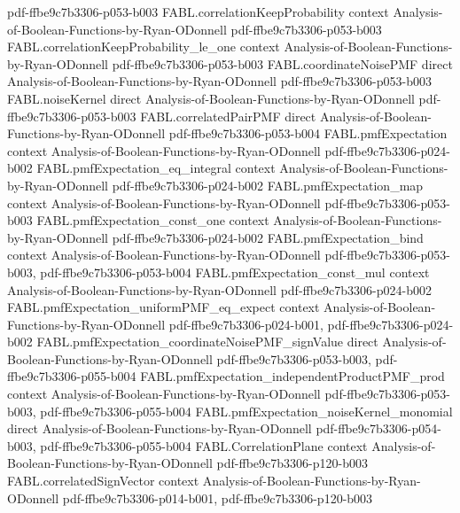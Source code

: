 \begin{theorem}
  {pdf-ffbe9c7b3306-p053-b003}
\proofstep
  {FABL.correlationKeepProbability}
  {context}
  {Analysis-of-Boolean-Functions-by-Ryan-ODonnell}
  {pdf-ffbe9c7b3306-p053-b003}
\proofstep
  {FABL.correlationKeepProbability_le_one}
  {context}
  {Analysis-of-Boolean-Functions-by-Ryan-ODonnell}
  {pdf-ffbe9c7b3306-p053-b003}
\proofstep
  {FABL.coordinateNoisePMF}
  {direct}
  {Analysis-of-Boolean-Functions-by-Ryan-ODonnell}
  {pdf-ffbe9c7b3306-p053-b003}
\proofstep
  {FABL.noiseKernel}
  {direct}
  {Analysis-of-Boolean-Functions-by-Ryan-ODonnell}
  {pdf-ffbe9c7b3306-p053-b003}
\proofstep
  {FABL.correlatedPairPMF}
  {direct}
  {Analysis-of-Boolean-Functions-by-Ryan-ODonnell}
  {pdf-ffbe9c7b3306-p053-b004}
\proofstep
  {FABL.pmfExpectation}
  {context}
  {Analysis-of-Boolean-Functions-by-Ryan-ODonnell}
  {pdf-ffbe9c7b3306-p024-b002}
\proofstep
  {FABL.pmfExpectation_eq_integral}
  {context}
  {Analysis-of-Boolean-Functions-by-Ryan-ODonnell}
  {pdf-ffbe9c7b3306-p024-b002}
\proofstep
  {FABL.pmfExpectation_map}
  {context}
  {Analysis-of-Boolean-Functions-by-Ryan-ODonnell}
  {pdf-ffbe9c7b3306-p053-b003}
\proofstep
  {FABL.pmfExpectation_const_one}
  {context}
  {Analysis-of-Boolean-Functions-by-Ryan-ODonnell}
  {pdf-ffbe9c7b3306-p024-b002}
\proofstep
  {FABL.pmfExpectation_bind}
  {context}
  {Analysis-of-Boolean-Functions-by-Ryan-ODonnell}
  {pdf-ffbe9c7b3306-p053-b003,
    pdf-ffbe9c7b3306-p053-b004}
\proofstep
  {FABL.pmfExpectation_const_mul}
  {context}
  {Analysis-of-Boolean-Functions-by-Ryan-ODonnell}
  {pdf-ffbe9c7b3306-p024-b002}
\proofstep
  {FABL.pmfExpectation_uniformPMF_eq_expect}
  {context}
  {Analysis-of-Boolean-Functions-by-Ryan-ODonnell}
  {pdf-ffbe9c7b3306-p024-b001,
    pdf-ffbe9c7b3306-p024-b002}
\proofstep
  {FABL.pmfExpectation_coordinateNoisePMF_signValue}
  {direct}
  {Analysis-of-Boolean-Functions-by-Ryan-ODonnell}
  {pdf-ffbe9c7b3306-p053-b003,
    pdf-ffbe9c7b3306-p055-b004}
\proofstep
  {FABL.pmfExpectation_independentProductPMF_prod}
  {context}
  {Analysis-of-Boolean-Functions-by-Ryan-ODonnell}
  {pdf-ffbe9c7b3306-p053-b003,
    pdf-ffbe9c7b3306-p055-b004}
\proofstep
  {FABL.pmfExpectation_noiseKernel_monomial}
  {direct}
  {Analysis-of-Boolean-Functions-by-Ryan-ODonnell}
  {pdf-ffbe9c7b3306-p054-b003,
    pdf-ffbe9c7b3306-p055-b004}
\proofstep
  {FABL.CorrelationPlane}
  {context}
  {Analysis-of-Boolean-Functions-by-Ryan-ODonnell}
  {pdf-ffbe9c7b3306-p120-b003}
\proofstep
  {FABL.correlatedSignVector}
  {context}
  {Analysis-of-Boolean-Functions-by-Ryan-ODonnell}
  {pdf-ffbe9c7b3306-p014-b001,
    pdf-ffbe9c7b3306-p120-b003}
\proofstep

\end{theorem}
